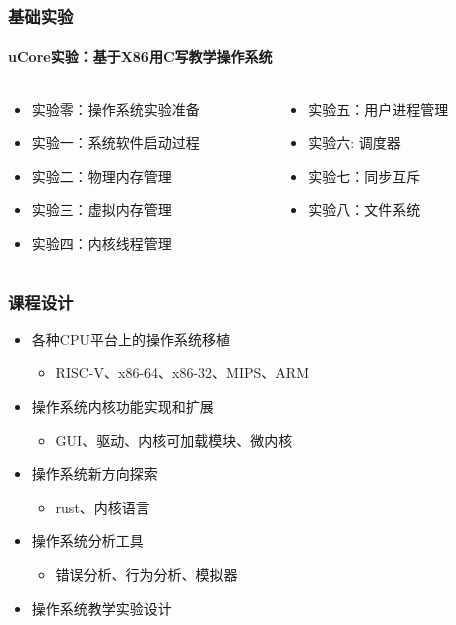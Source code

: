 \documentclass[UTF8]{ctexbeamer}
\begin{document}
\begin{frame}
\frametitle{基础实验}
\framesubtitle{uCore实验：基于X86用C写教学操作系统}
\begin{columns}
	
\begin{column}{0.5\textwidth}
\begin{itemize}
		\item 实验零：操作系统实验准备
		\item 实验一：系统软件启动过程
		\item 实验二：物理内存管理
		\item 实验三：虚拟内存管理
		\item 实验四：内核线程管理
\end{itemize}
\end{column}
 
\begin{column}{0.5\textwidth}
    \begin{itemize}
		\item 实验五：用户进程管理
		\item 实验六: 调度器
		\item 实验七：同步互斥
		\item 实验八：文件系统
	\end{itemize}
\end{column}

\end{columns}

\end{frame}

\begin{frame}
\frametitle{课程设计}
	\begin{itemize}
	\item 各种CPU平台上的操作系统移植
		\begin{itemize}	
		\item RISC-V、x86-64、x86-32、MIPS、ARM
		\end{itemize}
	\item 操作系统内核功能实现和扩展
		\begin{itemize}	
		\item GUI、驱动、内核可加载模块、微内核
		\end{itemize}
	\item 操作系统新方向探索	
		\begin{itemize}	
		\item rust、内核语言
		\end{itemize}
	\item 操作系统分析工具	
		\begin{itemize}	
		\item 错误分析、行为分析、模拟器
		\end{itemize}
	\item 操作系统教学实验设计
	\end{itemize}
\end{frame}
    
\end{document}
